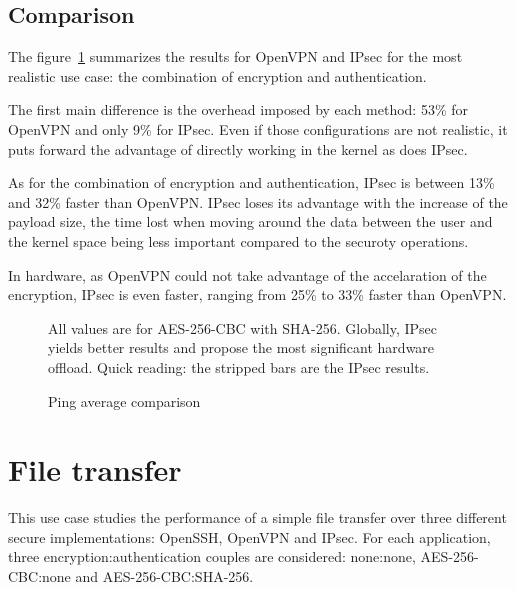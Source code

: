 \subsection{Comparison}
The figure~\ref{fig:ping-benchmark-comparison} summarizes the results for OpenVPN and IPsec for the most realistic use case: the combination of encryption and authentication.

\noindent The first main difference is the overhead imposed by each method: 53\% for OpenVPN and only 9\% for IPsec.
Even if those configurations are not realistic, it puts forward the advantage of directly working in the kernel as does IPsec.

As for the combination of encryption and authentication, IPsec is between 13\% and 32\% faster than OpenVPN.
IPsec loses its advantage with the increase of the payload size, the time lost when moving around the data between the user and the kernel space being less important compared to the securoty operations.

\noindent In hardware, as OpenVPN could not take advantage of the accelaration of the encryption, IPsec is even faster, ranging from 25\% to 33\% faster than OpenVPN.


\begin{figure}[ht]

\caption{Ping average comparison}{All values are for AES-256-CBC with SHA-256. Globally, IPsec yields better results and propose the most significant hardware offload. Quick reading: the stripped bars are the IPsec results.}
\label{fig:ping-benchmark-comparison}
\end{figure}














\section{File transfer}

This use case studies the performance of a simple file transfer over three different secure implementations: OpenSSH, OpenVPN and IPsec.
For each application, three encryption:authentication couples are considered: none:none, AES-256-CBC:none and AES-256-CBC:SHA-256. 

